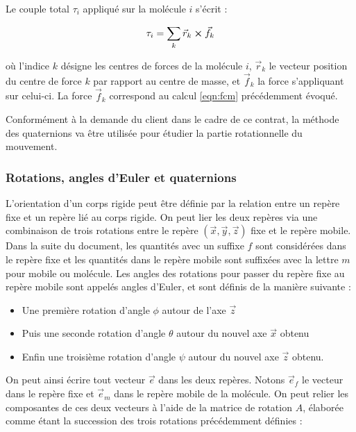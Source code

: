 \documentclass[12pt]{article}
\begin{document}
Le couple total $\tau_i$ appliqué sur la molécule $i$ s'écrit :

\begin{eqnarray}
\tau_i=\sum_k \vec{r}_k \boldsymbol\times \vec{f}_k
\end{eqnarray}

où l'indice $k$ désigne les centres de forces de la molécule $i$, $\vec{r}_k$ le vecteur position du centre de force $k$ par rapport au centre de masse, et $\vec{f}_k$ la force s'appliquant sur celui-ci. La force $\vec{f}_k$ correspond au calcul \ref{eqn:fcm} précédemment évoqué. 

Conformément à la demande du client dans le cadre de ce contrat, la méthode des quaternions va être utilisée pour étudier la partie rotationnelle du mouvement. 

		\subsubsection{Rotations, angles d'Euler et quaternions}

L'orientation d'un corps rigide peut être définie par la relation entre un repère fixe et un repère lié au corps rigide. On peut lier les deux repères via une combinaison de trois rotations entre le repère $\left(\vec{x},\vec{y},\vec{z}\right)$ fixe et le repère mobile. Dans la suite du document, les quantités avec un suffixe $f$ sont considérées dans le repère fixe et les quantités dans le repère mobile sont suffixées avec la lettre $m$ pour mobile ou molécule. Les angles des rotations pour passer du repère fixe au repère mobile sont appelés angles d'Euler, et sont définis de la manière suivante \cite{goldstein} :

\begin{itemize}
\item Une première rotation d'angle $\phi$ autour de l'axe $\vec{z}$
\item Puis une seconde rotation d'angle $\theta$ autour du nouvel axe $\vec{x}$ obtenu
\item Enfin une troisième rotation d'angle $\psi$ autour du nouvel axe $\vec{z}$ obtenu.
\end{itemize}

On peut ainsi écrire tout vecteur $\vec{e}$ dans les deux repères. Notons $\vec{e}_f$ le vecteur dans le repère fixe et $\vec{e}_m$ dans le repère mobile de la molécule. On peut relier les composantes de ces deux vecteurs à l'aide de la matrice de rotation $A$, élaborée comme étant la succession des trois rotations précédemment définies :
\end{document}
